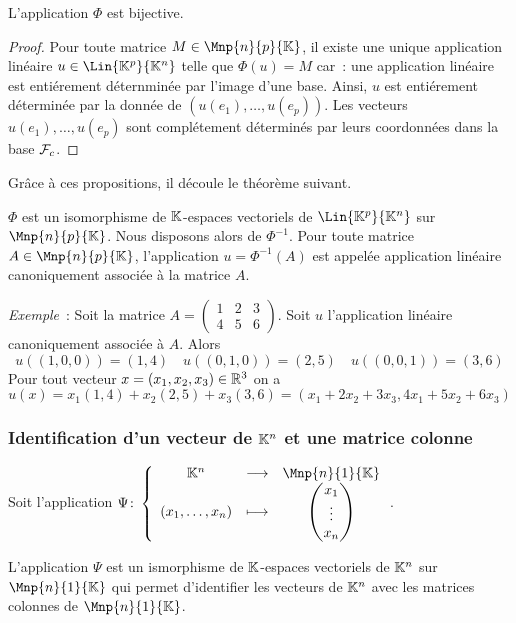 \begin{prop}
  L'application $\Phi$ est bijective.
\end{prop}
\begin{proof}
  Pour toute matrice $M \in \Mnp{n}{p}{\K}$, il existe une unique application linéaire $u \in \Lin{\K^p}{\K^n}$ telle que $\Phi(u)=M$ car~: une application linéaire est entiérement déternminée par l'image d'une base. Ainsi, $u$ est entiérement déterminée par la donnée de $(u(e_1), \ldots, u(e_p))$. Les vecteurs $u(e_1), \ldots, u(e_p)$ sont complétement déterminés par leurs coordonnées dans la base $\mathcal{F}_c$.
\end{proof}

Grâce à ces propositions, il découle le théorème suivant.
\begin{theo}
  $\Phi$ est un isomorphisme de $\mathbb{K}$-espaces vectoriels de $\Lin{\K^p}{\K^n}$ sur $\Mnp{n}{p}{\K}$. Nous disposons alors de $\Phi^{-1}$. Pour toute matrice $A \in \Mnp{n}{p}{\K}$, l'application $u=\Phi^{-1}(A)$ est appelée application linéaire canoniquement associée à la matrice $A$.
\end{theo}

\emph{Exemple}~: Soit la matrice $A=\begin{pmatrix} 1 & 2 & 3 \\ 4 & 5 & 6 \end{pmatrix}$. Soit $u$ l'application linéaire canoniquement associée à $A$. Alors
\begin{equation}
  u((1,0,0))=(1,4) \quad u((0,1,0))=(2,5) \quad u((0,0,1))=(3,6)
\end{equation}
Pour tout vecteur $x=(x_1,x_2,x_3) \in \mathbb{R}^3$ on a
\begin{equation}
  u(x)=x_1(1,4) + x_2(2,5) +x_3(3,6)=(x_1+2x_2+3x_3, 4x_1+5x_2+6x_3)
\end{equation}

\subsubsection{Identification d'un vecteur de $\mathbb{K}^n$ et une matrice colonne}

Soit l'application $\fonction{\Psi}{\K^n}{\Mnp{n}{1}{\K}}{(x_1,\ldots,x_n)}{\begin{pmatrix}x_1 \\ \vdots \\ x_n \end{pmatrix}}$.

\begin{theo}
  L'application $\Psi$ est un ismorphisme de $\mathbb{K}$-espaces vectoriels de $\mathbb{K}^n$ sur $\Mnp{n}{1}{\K}$ qui permet d'identifier les vecteurs de $\mathbb{K}^n$ avec les matrices colonnes de $\Mnp{n}{1}{\K}$.
\end{theo}

